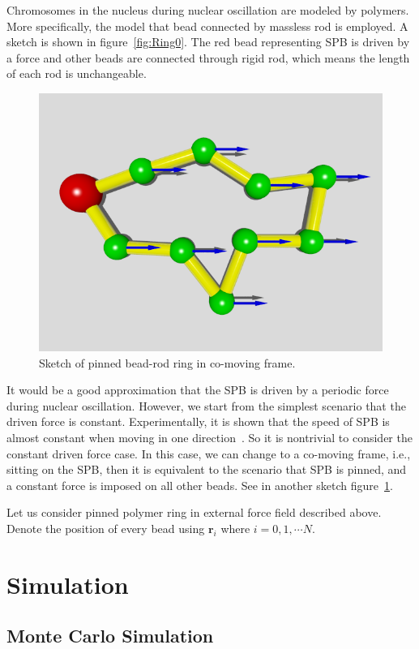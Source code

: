 \documentclass[12pt,a4paper]{article}
\begin{document}
Chromosomes in the nucleus during nuclear oscillation are modeled by polymers.
More specifically, the model that bead connected by massless rod is employed.
A sketch is shown in figure~\ref{fig:Ring0}. The red bead representing SPB is
driven by a force and other beads are connected through rigid rod, which means
the length of each rod is unchangeable.   

\begin{figure}[htpb]
	\centering
	\includegraphics[width=0.8\linewidth]{figs/Ring1.png}
	\caption{Sketch of pinned bead-rod ring in co-moving frame.}
	\label{fig:Ring1}
\end{figure}
It would be a good approximation that the SPB is driven by a periodic force
during nuclear oscillation. However, we start from the simplest scenario that
the driven force is constant. Experimentally, it is shown that the speed
of SPB is almost constant when moving in one direction~\cite{Vogel2009}. So it
is nontrivial to consider the constant driven force case. In this case, we can
change to a co-moving frame, i.e., sitting on the SPB, then it is equivalent
to the scenario that SPB is pinned, and a constant force is imposed on all
other beads. See in another sketch figure~\ref{fig:Ring1}. 

Let us consider pinned polymer ring in external force field described above.
Denote the position of every bead using $\mathbf{r}_i$ where $i = 0,1,\cdots N$.

\section{Simulation}
\label{sec:simulation}

\subsection{Monte Carlo Simulation}
\label{sub:monte_carlo_simulation}
\end{document}

